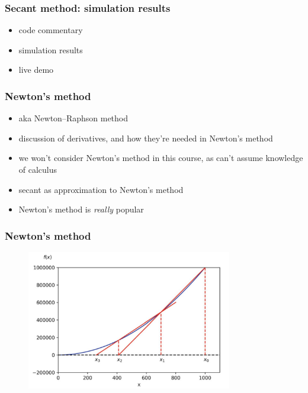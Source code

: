\documentclass[english,14pt]{beamer}
\begin{document}

\begin{frame}[fragile]

\frametitle{Secant method: simulation results}

\begin{itemize}
	\item code commentary
	\item simulation results
	\item live demo
\end{itemize}

\end{frame}


\begin{frame}[fragile]

\frametitle{Newton's method}

\begin{itemize}
	\item aka Newton--Raphson method
	\item discussion of derivatives, and how they're needed in Newton's method
	\item we won't consider Newton's method in this course, as can't assume knowledge of calculus
	\item secant as approximation to Newton's method
	\item Newton's method is \emph{really} popular
\end{itemize}

\end{frame}


\begin{frame}[fragile]

\frametitle{Newton's method}

\begin{figure}[ht]
	\centering
	\includegraphics[width=0.8\textwidth]{figures/NewtonsMethod}
\end{figure}

\end{frame}
\end{document}
